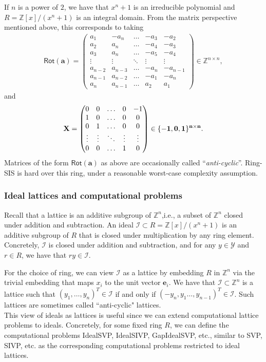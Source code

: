 \documentclass[cryptography,review,submit,pdftex,moreauthors,amsmath,amssymb,aps,strict]{Definitions/mdpi}
\begin{document}
    If $n$ is a power of $2$, we have that $x^n+1$ is an irreducible polynomial and $R=\mathbb{Z}[x]/(x^n+1)$ is an integral domain. From the matrix perspective mentioned above, this corresponds to taking
\begin{align}
    \mathsf{Rot}(\mathbf{a})=
    \begin{pmatrix}
    a_1 & -a_n &\dots& -a_3 & -a_2\\
    a_2 & a_n &\dots& -a_4 & -a_3\\
    a_3 & a_n &\dots& -a_5 & -a_4\\
    \vdots & \vdots &\ddots& \vdots & \vdots\\
    a_{n-2} & a_{n-3} &\dots& -a_n & -a_{n-1}\\
    a_{n-1} & a_{n-2} &\dots& -a_1 & -a_n\\
    a_{n} & a_{n-1} &\dots& a_2 & a_1
    \end{pmatrix}\in\mathbb{Z}^{n\times n},
\end{align}
    and 
\begin{align}
    \bf{X}=
    \begin{pmatrix}
    0 & 0 &\dots& 0 & -1\\
    1 & 0 &\dots& 0 & 0\\
    0 & 1 &\dots& 0 & 0\\
    \vdots & \vdots &\ddots& \vdots & \vdots\\
    0 & 0 &\dots& 1 & 0
    \end{pmatrix}\in\{-1,0,1\}^{n\times n}.
\end{align}
    Matrices of the form $\mathsf{Rot}(\mathbf{a})$ as above are occasionally called ``\textit{anti-cyclic}''. Ring-SIS is hard over this ring, under a reasonable worst-case complexity assumption.

\subsubsection{Ideal lattices and computational problems}
Recall that a lattice is an additive subgroup of $\mathbb{Z}^n$,i.e., a subset of $\mathbb{Z}^n$ closed under addition and subtraction. An ideal $\mathcal{I}\subset R=\mathbb{Z}[x]/(x^n+1)$ is an additive subgroup of $R$ that is closed under multiplication by any ring element. Concretely, $\mathcal{I}$ is closed under addition and subtraction, and for any $y\in\mathcal{Y}$ and $r\in R$, we have that $ry\in\mathcal{I}$.

For the choice of ring, we can view $\mathcal{I}$ as a lattice by embedding $R$ in $\mathbb{Z}^n$ via the trivial embedding that maps $x_i$ to the unit vector $\mathbf{e}_i$. We have that $\mathcal{I}\subset \mathbb{Z}^n$ is a lattice such that $(y_1,\dots,y_n)^T \in \mathcal{I}$ if and only if $(-y_n,y_1\dots,y_{n-1})^T \in \mathcal{I}$. Such lattices are sometimes called ``anti-cyclic" lattices.\\
This view of ideals as lattices is useful since we can extend computational lattice problems to ideals. Concretely, for some fixed ring $R$, we can define the computational problems IdealSVP, IdealSIVP, GapIdealSVP, etc., similar to SVP, SIVP, etc. as the corresponding computational problems restricted to ideal lattices.
\end{document}
